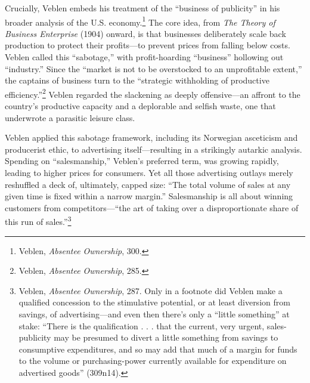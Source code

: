 \documentclass[openany,nobib]{tufte-book}
\begin{document}
Crucially, Veblen embeds his treatment of the ``business of publicity''
in his broader analysis of the U.S. economy.\footnote{Veblen, \emph{Absentee Ownership}, 300.} The core idea, from
\emph{The Theory of Business Enterprise} (1904) onward, is that
businesses deliberately scale back production to protect their
profits---to prevent prices from falling below costs. Veblen called this
``sabotage,'' with profit-hoarding ``business'' hollowing out
``industry.'' Since the ``market is not to be overstocked to an
unprofitable extent,'' the captains of business turn to the ``strategic
withholding of productive efficiency.''\footnote{Veblen, \emph{Absentee Ownership}, 285.} Veblen regarded the
slackening as deeply offensive---an affront to the country's productive
capacity and a deplorable and selfish waste, one that underwrote a
parasitic leisure class.

Veblen applied this sabotage framework, including its Norwegian
asceticism and producerist ethic, to advertising itself---resulting in a
strikingly autarkic analysis. Spending on ``salesmanship,'' Veblen's
preferred term, was growing rapidly, leading to higher prices for
consumers. Yet all those advertising outlays merely reshuffled a deck
of, ultimately, capped size: ``The total volume of sales at any given
time is fixed within a narrow margin.'' Salesmanship is all about
winning customers from competitors---``the art of taking over a
disproportionate share of this run of sales.''\footnote{Veblen, \emph{Absentee Ownership}, 287. Only in a footnote did Veblen
  make a qualified concession to the stimulative potential, or at least
  diversion from savings, of advertising---and even then there's only a
  ``little something'' at stake: ``There is the qualification . . . that
  the current, very urgent, sales-publicity may be presumed to divert a
  little something from savings to consumptive expenditures, and so may
  add that much of a margin for funds to the volume or purchasing-power
  currently available for expenditure on advertised goods'' (309n14).}
\end{document}
